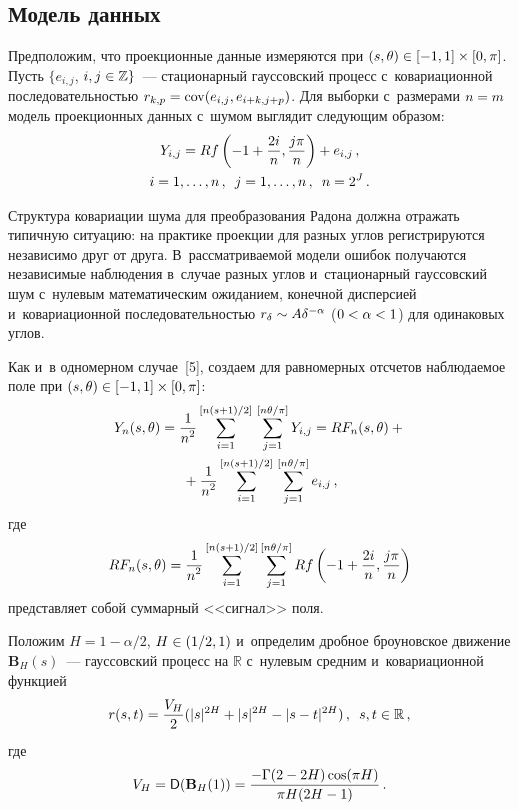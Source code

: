 \begin{multicols}{2}
\section{Модель данных}

Предположим, что проекционные данные измеряются при $(s,\theta)\hm\in [-1,1]\times[0,\pi]$.
Пусть $\{e_{i,j}$, $i,j \hm \in \mathbb{Z}\}$~--- стационарный гауссовский
процесс с~ковариационной последовательностью $r_{k,p} \hm= \cov (e_{i,j},
e_{i+k,j+p})$.
Для выборки с~размерами $n \hm= m$ модель проекционных данных
с~шумом выглядит следующим образом:
\begin{multline*}
Y_{i,j} = R f\left(-1+\displaystyle\frac{\displaystyle 2i\mathstrut}{\displaystyle n\mathstrut},\displaystyle\frac{\displaystyle j\pi\mathstrut}{\displaystyle n\mathstrut}\right) + e_{i,j}\,, \\
i = 1, \dots, n\,, \enskip j = 1, \dots, n\,, \enskip n=2^J\,.
\end{multline*}
%

Структура ковариации шума для преобразования Радона должна
отражать типичную ситуацию: на практике проекции для разных углов
регистрируются независимо друг от друга.
В~рассматриваемой модели ошибок получаются независимые наблюдения
в~случае разных углов и~стационарный гауссовский шум
с~нулевым математическим ожиданием, конечной дисперсией
и~ковариационной последовательностью $r_\delta \hm\sim A \delta^{-\alpha}$
($0\hm<\alpha\hm<1$) для одинаковых углов.

Как и~в одномерном случае~[5], создаем для равномерных отсчетов наблюдаемое
поле при $(s,\theta)\hm\in [-1,1]\times[0,\pi]$:
\begin{multline*}
Y_n(s,\theta) = \displaystyle\frac{\displaystyle 1\mathstrut}{\displaystyle n^2\mathstrut} \sum\limits_{i=1}^{[n(s+1)/2]}\,
\sum\limits_{j=1}^{[n\theta/\pi]} Y_{i,j}=
RF_n(s,\theta) + {}\\
{}+\displaystyle\frac{\displaystyle 1\mathstrut}{\displaystyle n^2\mathstrut} \sum\limits_{i=1}^{[n(s+1)/2]}\,
\sum\limits_{j=1}^{[n\theta/\pi]} e_{i,j}\,,
\end{multline*}
где
\begin{equation*}
RF_n(s,\theta)= \displaystyle\frac{\displaystyle 1\mathstrut}{\displaystyle n^2\mathstrut}
\sum\limits_{i=1}^{[n(s+1)/2]}\sum\limits_{j=1}^{[n\theta/\pi]}
R f\left(-1+\displaystyle\frac{\displaystyle 2i\mathstrut}{\displaystyle n\mathstrut},\displaystyle\frac{\displaystyle j\pi\mathstrut}{\displaystyle n\mathstrut}\right)
\end{equation*}
представляет собой суммарный <<сигнал>> поля.

Положим $H = 1- \alpha/2$, $H \hm\in (1/2,1)$
и~определим дробное броуновское движение $\mathbf{B}_H(s)$~---
гауссовский процесс на $\mathbb{R}$ с~нулевым средним  и~ковариационной функцией
\begin{equation*}
r(s,t) = \displaystyle\frac{\displaystyle V_H\mathstrut}{\displaystyle 2\mathstrut}(|s|^{2H} + |s|^{2H} - |s-t|^{2H})\,, \enskip s,t \in \mathbb{R}\,,
\end{equation*}
где
$$
V_H = {\sf D} (\mathbf{B}_H(1)) =
\displaystyle\frac{\displaystyle -\Gamma(2-2H)\cos(\pi H)\mathstrut}{\displaystyle \pi H(2H-1)\mathstrut}\,.
$$


\end{multicols}
